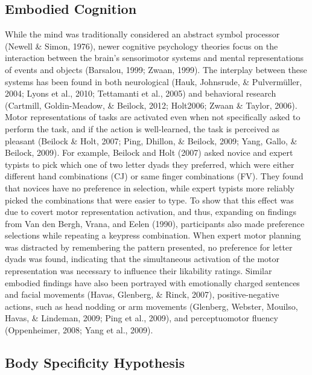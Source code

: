 \documentclass[english,man]{apa6}
\theoremstyle{definition}
\theoremstyle{definition}
\theoremstyle{definition}
\theoremstyle{remark}
\begin{document}
\subsection{Embodied Cognition}\label{embodied-cognition}

While the mind was traditionally considered an abstract symbol processor
(Newell \& Simon, 1976), newer cognitive psychology theories focus on
the interaction between the brain's sensorimotor systems and mental
representations of events and objects (Barsalou, 1999; Zwaan, 1999). The
interplay between these systems has been found in both neurological
(Hauk, Johnsrude, \& Pulvermüller, 2004; Lyons et al., 2010; Tettamanti
et al., 2005) and behavioral research (Cartmill, Goldin-Meadow, \&
Beilock, 2012; Holt2006; Zwaan \& Taylor, 2006). Motor representations
of tasks are activated even when not specifically asked to perform the
task, and if the action is well-learned, the task is perceived as
pleasant (Beilock \& Holt, 2007; Ping, Dhillon, \& Beilock, 2009; Yang,
Gallo, \& Beilock, 2009). For example, Beilock and Holt (2007) asked
novice and expert typists to pick which one of two letter dyads they
preferred, which were either different hand combinations (CJ) or same
finger combinations (FV). They found that novices have no preference in
selection, while expert typists more reliably picked the combinations
that were easier to type. To show that this effect was due to covert
motor representation activation, and thus, expanding on findings from
Van den Bergh, Vrana, and Eelen (1990), participants also made
preference selections while repeating a keypress combination. When
expert motor planning was distracted by remembering the pattern
presented, no preference for letter dyads was found, indicating that the
simultaneous activation of the motor representation was necessary to
influence their likability ratings. Similar embodied findings have also
been portrayed with emotionally charged sentences and facial movements
(Havas, Glenberg, \& Rinck, 2007), positive-negative actions, such as
head nodding or arm movements (Glenberg, Webster, Mouilso, Havas, \&
Lindeman, 2009; Ping et al., 2009), and perceptuomotor fluency
(Oppenheimer, 2008; Yang et al., 2009).

\subsection{Body Specificity
Hypothesis}\label{body-specificity-hypothesis}
\end{document}
